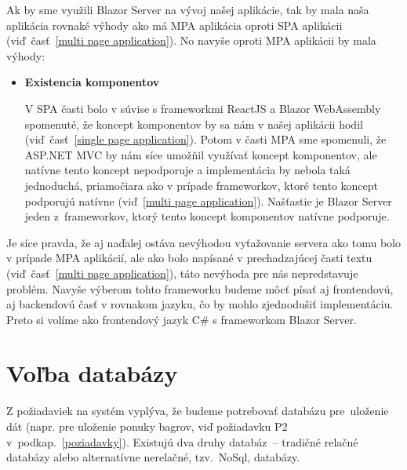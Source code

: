 Ak by sme využili Blazor Server na vývoj našej aplikácie, tak by mala naša aplikácia rovnaké výhody ako má MPA aplikácia oproti SPA aplikácii (viď~časť~\ref{multi page application}). No navyše oproti MPA aplikácii by mala výhody:

\begin{itemize}
\item \textbf{Existencia komponentov}

V SPA časti bolo v súvise s frameworkmi ReactJS a Blazor WebAssembly spomenuté, že koncept komponentov by sa nám v našej aplikácii hodil (viď~časť~\ref{single page application}). Potom v časti MPA sme spomenuli, že ASP.NET MVC by nám síce umožňil využívať koncept komponentov, ale natívne tento koncept nepodporuje a implementácia by nebola taká jednoduchá, priamočiara ako v prípade frameworkov, ktoré tento koncept podporujú natívne (viď~\ref{multi page application}). Našťastie je Blazor Server jeden z~frameworkov, ktorý tento koncept komponentov natívne podporuje.
\end{itemize}

Je síce pravda, že aj naďalej ostáva nevýhodou vyťažovanie servera ako tomu bolo v prípade MPA aplikácií, ale ako bolo napísané v prechadzajúcej časti textu (viď~časť~\ref{multi page application}), táto nevýhoda pre nás nepredstavuje problém. Navyše výberom tohto frameworku budeme môcť písať aj frontendovú, aj backendovú časť v rovnakom jazyku, čo by mohlo zjednodušiť implementáciu. Preto si volíme ako frontendový jazyk C\# s frameworkom Blazor Server.

\section{Voľba databázy}
\label{volba databazy}

Z požiadaviek na systém vyplýva, že budeme potrebovať databázu pre~uloženie dát (napr. pre uloženie ponuky bagrov, viď požiadavku P2 v~podkap.~\ref{poziadavky}). Existujú dva druhy databáz~-- tradičné relačné databázy alebo alternatívne nerelačné, tzv.~NoSql, databázy.


